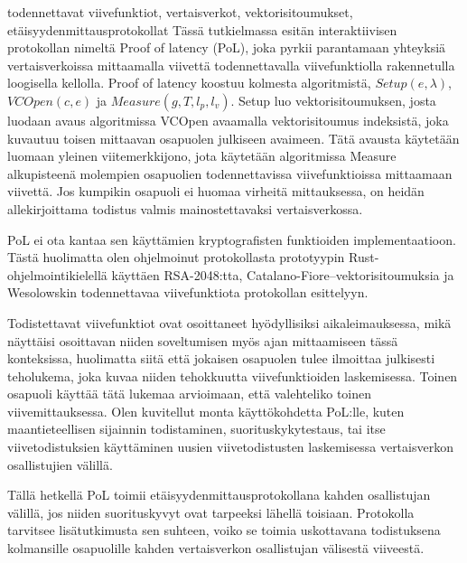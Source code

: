 \begin{itabstract}{todennettavat viivefunktiot, vertaisverkot, vektorisitoumukset, etäisyydenmittausprotokollat}
	Tässä tutkielmassa esitän interaktiivisen protokollan nimeltä Proof of latency (PoL), joka pyrkii parantamaan yhteyksiä vertaisverkoissa mittaamalla viivettä todennettavalla viivefunktiolla rakennetulla loogisella kellolla. Proof of latency koostuu kolmesta algoritmistä, \(Setup(e, \lambda)\), \(VCOpen(c, e)\) ja \(Measure(g, T, l_p, l_v)\). Setup luo vektorisitoumuksen, josta luodaan avaus algoritmissa VCOpen avaamalla vektorisitoumus indeksistä, joka kuvautuu toisen mittaavan osapuolen julkiseen avaimeen. Tätä avausta käytetään luomaan yleinen viitemerkkijono, jota käytetään algoritmissa Measure alkupisteenä molempien osapuolien todennettavissa viivefunktioissa mittaamaan viivettä. Jos kumpikin osapuoli ei huomaa virheitä mittauksessa, on heidän allekirjoittama todistus valmis mainostettavaksi vertaisverkossa.

PoL ei ota kantaa sen käyttämien kryptografisten funktioiden implementaatioon. Tästä huolimatta olen ohjelmoinut protokollasta prototyypin Rust-ohjelmointikielellä käyttäen RSA-2048:tta, Catalano-Fiore--vektorisitoumuksia ja Wesolowskin todennettavaa viivefunktiota protokollan esittelyyn. 

Todistettavat viivefunktiot ovat osoittaneet hyödyllisiksi aikaleimauksessa, mikä näyttäisi osoittavan niiden soveltumisen myös ajan mittaamiseen tässä konteksissa, huolimatta siitä että jokaisen osapuolen tulee ilmoittaa julkisesti teholukema, joka kuvaa niiden tehokkuutta viivefunktioiden laskemisessa. Toinen osapuoli käyttää tätä lukemaa arvioimaan, että valehteliko toinen viivemittauksessa. Olen kuvitellut monta käyttökohdetta PoL:lle, kuten maantieteellisen sijainnin todistaminen, suorituskykytestaus, tai itse viivetodistuksien käyttäminen uusien viivetodistusten laskemisessa vertaisverkon osallistujien välillä.

Tällä hetkellä PoL toimii etäisyydenmittausprotokollana kahden osallistujan välillä, jos niiden suorituskyvyt ovat tarpeeksi lähellä toisiaan. Protokolla tarvitsee lisätutkimusta sen suhteen, voiko se toimia uskottavana todistuksena kolmansille osapuolille kahden vertaisverkon osallistujan välisestä viiveestä.
\end{itabstract}
